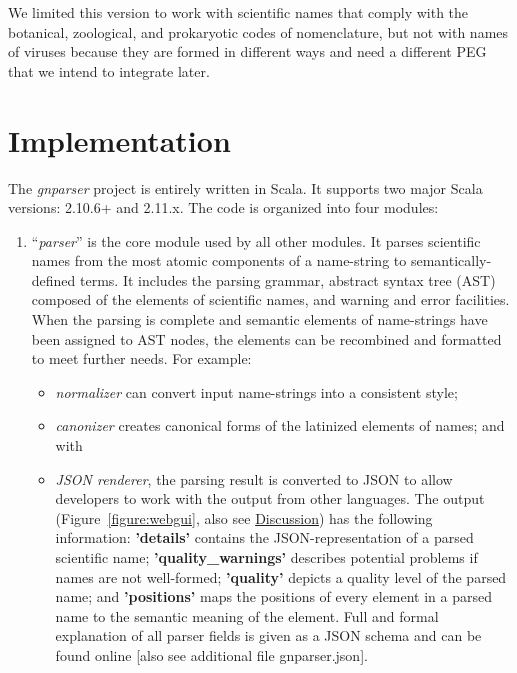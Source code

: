 \documentclass{bmcart}
\begin{document}
We limited this version to work with scientific names that comply with the botanical, zoological, and prokaryotic codes of nomenclature, but not with names of viruses because they are formed in different ways \cite{ICTV, Patterson2016} and need a different PEG that we intend to integrate later.

\section*{Implementation}

The \textit{gnparser} project is entirely written in Scala. It supports two major Scala versions: 2.10.6+ and 2.11.x. The code is organized into four modules:

\begin{enumerate}

  \item ``\textit{parser}'' is the core module used by all other modules. It parses scientific names from the most atomic components of a name-string to semantically-defined terms. It includes the parsing grammar, abstract syntax tree (AST) composed of the elements of scientific names, and warning and error facilities. When the parsing is complete and semantic elements of name-strings have been assigned to AST nodes, the elements can be recombined and formatted to meet further needs. For example:

\begin{itemize}

  \item \textit{normalizer} can convert input name-strings into a consistent style;

  \item \textit{canonizer} creates canonical forms of the latinized elements of names; and with

  \item \textit{JSON renderer}, the parsing result is converted to JSON \cite{bray2014javascript} to allow developers to work with the output from other languages. The output (Figure~\ref{figure:webgui}, also see \hyperref[sec:discussion]{Discussion}) has the following information: \textbf{'details'} contains the JSON-representation of a parsed scientific name; \textbf{'quality\_warnings'} describes potential problems if names are not well-formed; \textbf{'quality'} depicts a quality level of the parsed name; and \textbf{'positions'} maps the positions of every element in a parsed name to the semantic meaning of the element. Full and formal explanation of all parser fields is given as a JSON schema and can be found online \cite{gnparser-json} [also see additional file gnparser.json].


\end{itemize}
\end{enumerate}
\end{document}
